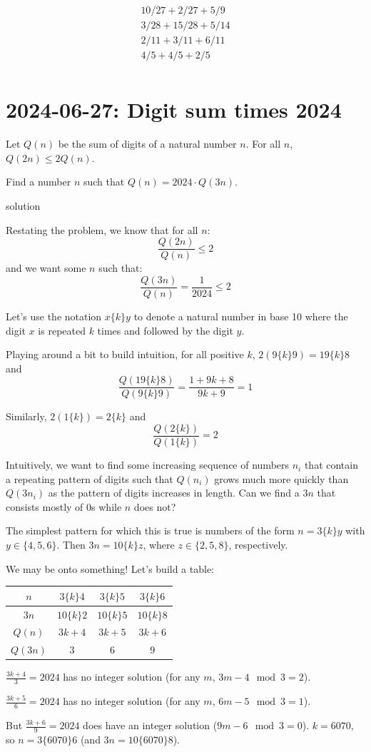 \documentclass[11pt, oneside]{amsart}
\newcommand{\problem}[2]{\section*{#1: #2}}
\newcommand{\solution}[0]{{\sc solution}}
\begin{document}
\begin{align*}
10/27 + 2/27   + 5/9\\
3/28  + 15/28  + 5/14\\
2/11  + 3/11   + 6/11\\
4/5   + 4/5    + 2/5\\
\end{align*}

\newpage
\problem{2024-06-27}{Digit sum times 2024}

Let $Q(n)$ be the sum of digits of a natural number $n$. For all $n$, $Q(2n) \leq 2Q(n)$.

Find a number $n$ such that $Q(n) = 2024 \cdot Q(3n)$.

\solution

Restating the problem, we know that for all $n$:
\[ \frac{Q(2n)}{Q(n)} \leq 2 \]
and we want some $n$ such that:
\[ \frac{Q(3n)}{Q(n)} = \frac{1}{2024} \leq 2 \]

Let's use the notation $x\{k\}y$ to denote a natural number in base 10 where the digit $x$ is repeated $k$ times
and followed by the digit $y$.

Playing around a bit to build intuition, for all positive $k$, $2(9\{k\}9) = 19\{k\}8$ and
\[ \frac{Q(19\{k\}8)}{Q(9\{k\}9)} = \frac{1+9k+8}{9k+9} = 1\]

Similarly, $2(1\{k\}) = 2\{k\}$ and
\[ \frac{Q(2\{k\})}{Q(1\{k\})} = 2\]

Intuitively, we want to find some increasing sequence of numbers $n_i$ that contain a repeating pattern of digits
such that $Q(n_i)$ grows much more quickly than $Q(3n_i)$ as the pattern of digits increases in length.
Can we find a $3n$ that consists mostly of 0s while $n$ does not?

The simplest pattern for which this is true is numbers of the form $n = 3\{k\}y$ with $y \in \{ 4, 5, 6 \}$. Then
$3n = 10\{k\}z$, where $z \in \{ 2, 5, 8 \}$, respectively.

We may be onto something! Let's build a table:

\begin{table}[h!]
\centering
\begin{tabular}{|c|c|c|c|}
	\hline
	$n$      & $3\{k\}4$    & $3\{k\}5$    & $3\{k\}6$ \\
	\hline
	$3n$     & $10\{k\}2$   & $10\{k\}5$   & $10\{k\}8$ \\
	\hline
	$Q(n)$   & $3k+4$       & $3k+5$       & $3k+6$ \\
	\hline
	$Q(3n)$  & $3$          & $6$          & $9$ \\
	\hline
\end{tabular}
\end{table}

$\frac{3k+4}{3} = 2024$ has no integer solution (for any $m$, $3m-4 \mod 3 = 2$).

$\frac{3k+5}{6} = 2024$ has no integer solution (for any $m$, $6m-5 \mod 3 = 1$).

But $\frac{3k+6}{9} = 2024$ does have an integer solution ($9m-6 \mod 3 = 0$). $k = 6070$,
so $n = 3\{6070\}6$ (and $3n = 10\{6070\}8$).
\end{document}
